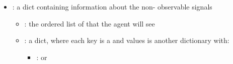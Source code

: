 \documentclass[11pt]{article}
\begin{document}
\begin{itemize}
\begin{itemize}
\begin{itemize}
        \item {}: dictionary of state names. Each state maps to an object with:
        \begin{itemize}
            \item {}: a range 
            \item {}: either  or 
            \item \termMinSRDDistance
            \item \termMinAbsDist
        \end{itemize}
        \item {}: dictionary of parameter names. Each parameter maps to an object with:
        \begin{itemize}
            \item {}: a range 
            \item \termMinSRDDistance
            \item \termMinAbsDist 
            \item {}: either  or 
        \end{itemize}
    \end{itemize}
    \item {}: a dict containing information about the non- observable signals
    \begin{itemize}
    \item {}: the ordered list of  that the agent will see
    \item {}: a dict, where each key is a  and values is another dictionary with:
    \begin{itemize} 
        \item {}:    or 
    \end{itemize}




\end{itemize}
\end{itemize}
\end{itemize}
\end{document}
